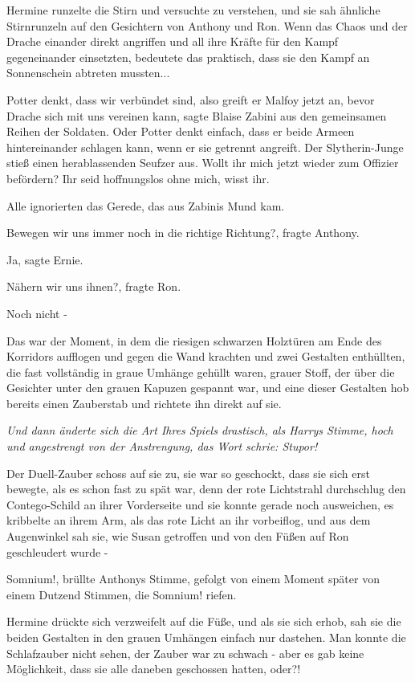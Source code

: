 Hermine runzelte die Stirn und versuchte zu verstehen, und sie sah ähnliche
Stirnrunzeln auf den Gesichtern von Anthony und Ron. Wenn das Chaos und der
Drache einander direkt angriffen und all ihre Kräfte für den Kampf gegeneinander
einsetzten, bedeutete das praktisch, dass sie den Kampf an Sonnenschein abtreten
mussten...

\glqq{}Potter denkt, dass wir verbündet sind, also greift er Malfoy jetzt an,
bevor Drache sich mit uns vereinen kann\grqq{}, sagte Blaise Zabini aus den
gemeinsamen Reihen der Soldaten. \glqq{}Oder Potter denkt einfach, dass er beide
Armeen hintereinander schlagen kann, wenn er sie getrennt angreift.\grqq{} Der
Slytherin-Junge stieß einen herablassenden Seufzer aus. \glqq{}Wollt ihr mich
jetzt wieder zum Offizier befördern? Ihr seid hoffnungslos ohne mich, wisst
ihr.\grqq{}

Alle ignorierten das Gerede, das aus Zabinis Mund kam.

\glqq{}Bewegen wir uns immer noch in die richtige Richtung?\grqq{}, fragte
Anthony.

\glqq{}Ja\grqq{}, sagte Ernie.

\glqq{}Nähern wir uns ihnen?\grqq{}, fragte Ron.

\glqq{}Noch nicht -\grqq{}

Das war der Moment, in dem die riesigen schwarzen Holztüren am Ende des
Korridors aufflogen und gegen die Wand krachten und zwei Gestalten enthüllten,
die fast vollständig in graue Umhänge gehüllt waren, grauer Stoff, der über die
Gesichter unter den grauen Kapuzen gespannt war, und eine dieser Gestalten hob
bereits einen Zauberstab und richtete ihn direkt auf sie.

\emph{Und dann änderte sich die Art Ihres Spiels drastisch, als Harrys Stimme,
hoch und angestrengt von der Anstrengung, das Wort schrie: \glqq{}Stupor!\grqq{}
}

Der Duell-Zauber schoss auf sie zu, sie war so geschockt, dass sie sich erst
bewegte, als es schon fast zu spät war, denn der rote Lichtstrahl durchschlug
den Contego-Schild an ihrer Vorderseite und sie konnte gerade noch ausweichen,
es kribbelte an ihrem Arm, als das rote Licht an ihr vorbeiflog, und aus dem
Augenwinkel sah sie, wie Susan getroffen und von den Füßen auf Ron geschleudert
wurde -

\glqq{}Somnium!\grqq{}, brüllte Anthonys Stimme, gefolgt von einem Moment später
von einem Dutzend Stimmen, die \glqq{}Somnium!\grqq{} riefen.

Hermine drückte sich verzweifelt auf die Füße, und als sie sich erhob, sah sie
die beiden Gestalten in den grauen Umhängen einfach nur dastehen. Man konnte die
Schlafzauber nicht sehen, der Zauber war zu schwach - aber es gab keine
Möglichkeit, dass sie alle daneben geschossen hatten, oder?!

